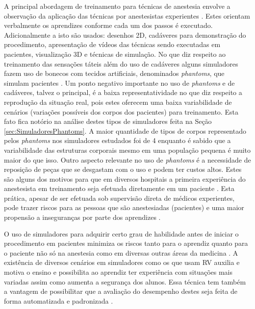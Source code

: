 A principal abordagem de treinamento para técnicas de anestesia envolve a observação da aplicação das técnicas por anestesistas experientes \cite{Vrillon2022}. Estes orientam verbalmente os aprendizes conforme cada um dos passos é executado. Adicionalmente a isto são usados: desenhos 2D, cadáveres para demonstração do procedimento, apresentação de vídeos das técnicas sendo executadas em pacientes, visualização 3D \cite{Vrillon2022} e técnicas de simulação. No que diz respeito ao treinamento das sensações táteis além do uso de cadáveres alguns simuladores fazem uso de bonecos com tecidos artificiais, denominados \textit{phantoms}, que simulam pacientes \cite{Dreifaldt2006, KyotoKagaku2015, Mashari2018}. Um ponto negativo importante no uso de \textit{phantoms} e de cadáveres, talvez o principal, é a baixa representatividade no que diz respeito a reprodução da situação real, pois estes oferecem uma baixa variabilidade de cenários (variações possíveis dos corpos dos pacientes) para treinamento. Esta fato fica notório na análise destes tipos de simuladores feita na Seção \ref{sec:SimuladoresPhantoms}. A maior quantidade de tipos de corpos representado pelos \textit{phantoms} nos simuladores estudados foi de 4 enquanto é sabido que a variabilidade das estruturas corporais mesmo em uma população pequena é muito maior do que isso. Outro aspecto relevante no uso de \textit{phantoms} é a necessidade de reposição de peças que se desgastam com o uso e podem ter custos altos. Estes são alguns dos motivos para que em diversos hospitais a primeira experiência do anestesista em treinamento seja efetuada diretamente em um paciente \cite{Aggarwal2009, Grantcharov2008, Smith2005, Watterson2007}. Esta prática, apesar de ser efetuada sob supervisão direta de médicos experientes, pode trazer riscos para as pessoas que são anestesiadas (pacientes) e uma maior propensão a inseguranças por parte dos aprendizes \cite{Elmofty2017}. 

O uso de simuladores para adquirir certo grau de habilidade antes de iniciar o procedimento em pacientes minimiza os riscos tanto para o aprendiz quanto para o paciente não só na anestesia \cite{Escobar-Castillejos2016, Yunoki2018} como em diversas outras áreas da medicina \cite{Akhtar2014, Alvarez-Lopez2020, Hamm2022}. A existência de diversos cenários em simuladores como os que usam \acrfull{RV} auxilia e motiva o ensino e possibilita ao aprendiz ter experiência com situações mais variadas assim como aumenta a segurança dos alunos. Essa técnica tem também a vantagem de possibilitar que a avaliação do desempenho destes seja feita de forma automatizada e padronizada \cite{Willis2014}. 

